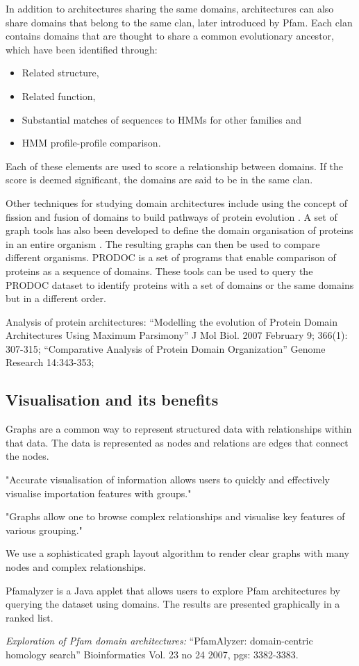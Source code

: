 In addition to architectures sharing the same domains, architectures can also share domains that belong to the same clan, later introduced by  Pfam\cite{pfamdb}. Each clan contains domains that are thought to share a common evolutionary ancestor, which have been identified through:
\begin{itemize}
	\item Related structure,
	\item Related function,
	\item Substantial matches of sequences to HMMs for other families and
	\item HMM profile-profile comparison.
\end{itemize}

Each of these elements are used to score a relationship between domains. If the score is deemed significant, the domains are said to be in the same clan.

Other techniques for studying domain architectures include using the concept of fission and fusion of domains to build pathways of protein evolution \cite{fong}. A set of graph tools has also been developed to define the domain organisation of proteins in an entire organism \cite{cado}. The resulting graphs can then be used to compare different organisms. PRODOC \cite{prodoc} is a set of programs that enable comparison of proteins as a sequence of domains. These tools can be used to query the PRODOC dataset to identify proteins with a set of domains or the same domains but in a different order. 

Analysis of protein architectures: ``Modelling the evolution of Protein Domain Architectures Using Maximum Parsimony'' J Mol Biol. 2007 February 9; 366(1): 307-315; ``Comparative Analysis of Protein Domain Organization'' Genome Research 14:343-353;

\subsection{Visualisation and its benefits}
Graphs are a common way to represent structured data with relationships within that data. The data is represented as nodes and relations are edges that connect the nodes. 

"Accurate visualisation of information allows users to quickly and effectively visualise importation features with groups."

"Graphs allow one to browse complex relationships and visualise key features of various grouping."

We use a sophisticated graph layout algorithm to render clear graphs with many nodes and complex relationships.

Pfamalyzer is a Java applet that allows users to explore Pfam architectures by querying the dataset using domains. The results are presented graphically in a ranked list.

\emph{Exploration of Pfam domain architectures:} ``PfamAlyzer: domain-centric homology search'' Bioinformatics Vol. 23 no 24 2007, pgs: 3382-3383.


